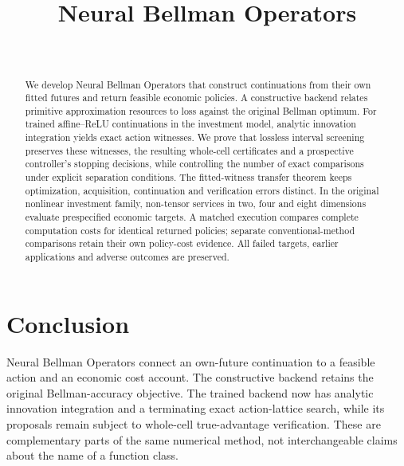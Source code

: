 \documentclass[ecta,nameyear,draft]{econsocart}
\begin{document}
\begin{frontmatter}
\title{Neural Bellman Operators}
\begin{aug}
\author[id=au1,addressref={add1}]{~}
\address[id=add1]{Peking University}
\end{aug}
\begin{abstract}
We develop Neural Bellman Operators that construct continuations from their own fitted futures and return feasible economic policies. A constructive backend relates primitive approximation resources to loss against the original Bellman optimum. For trained affine--ReLU continuations in the investment model, analytic innovation integration yields exact action witnesses. We prove that lossless interval screening preserves these witnesses, the resulting whole-cell certificates and a prospective controller's stopping decisions, while controlling the number of exact comparisons under explicit separation conditions. The fitted-witness transfer theorem keeps optimization, acquisition, continuation and verification errors distinct. In the original nonlinear investment family, non-tensor services in two, four and eight dimensions evaluate prespecified economic targets. A matched execution compares complete computation costs for identical returned policies; separate conventional-method comparisons retain their own policy-cost evidence. All failed targets, earlier applications and adverse outcomes are preserved.
\end{abstract}
\begin{keyword}
\end{keyword}
\end{frontmatter}















\section{Conclusion}\label{sec:conclusion56}
Neural Bellman Operators connect an own-future continuation to a feasible action and an economic cost account. The constructive backend retains the original Bellman-accuracy objective. The trained backend now has analytic innovation integration and a terminating exact action-lattice search, while its proposals remain subject to whole-cell true-advantage verification. These are complementary parts of the same numerical method, not interchangeable claims about the name of a function class.
\end{document}
